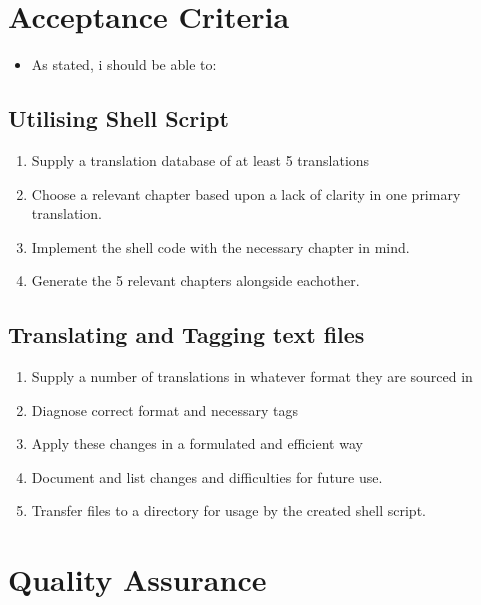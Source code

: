 \documentclass{article}
\begin{document}
\section{Acceptance Criteria}
\begin{itemize}
    \item{As stated, i should be able to:} 
\end{itemize}

\subsection{Utilising Shell Script}

\begin{enumerate}

\item{Supply a translation database of at least 5 translations}

\item{Choose a relevant chapter based upon a lack of clarity in one primary translation.}

\item{Implement the shell code with the necessary chapter in mind.}

\item{Generate the 5 relevant chapters alongside eachother.}

\end{enumerate}

\subsection{Translating and Tagging text files}

\begin{enumerate}
\item{Supply a number of translations in whatever format they are sourced in}

\item{Diagnose correct format and necessary tags}

\item{Apply these changes in a formulated and efficient way}

\item{Document and list changes and difficulties for future use.}

\item{Transfer files to a directory for usage by the created shell script.}
\end{enumerate}


\section{Quality Assurance}
\end{document}

